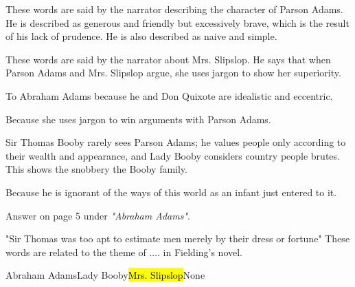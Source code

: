 \documentclass[12pt, a4paper]{article}
\begin{document}



These words are said by the narrator describing the character of Parson Adams.
He is described as generous and friendly but excessively brave, which is the result of
his lack of prudence. He is also described as naive and simple.


These words are said by the narrator about Mrs. Slipslop. He says that when Parson Adams and 
Mrs. Slipslop argue, she uses jargon to show her superiority.


To Abraham Adams because he and Don Quixote are idealistic and eccentric.


Because she uses jargon to win arguments with Parson Adams.



Sir Thomas Booby rarely sees Parson Adams; he values people only according to their wealth and appearance, and Lady Booby
considers country people brutes. This shows the snobbery the Booby family.



Because he is ignorant of the ways of this world as an infant just entered to it.


Answer on page 5 under \textit{"Abraham Adams"}.

{"Sir Thomas was too apt to estimate men merely
by their dress or fortune" These words are related to the
theme of .... in Fielding's novel.}

{Abraham Adams}{Lady Booby}{\hl{Mrs. Slipslop}}{None}
\end{document}
